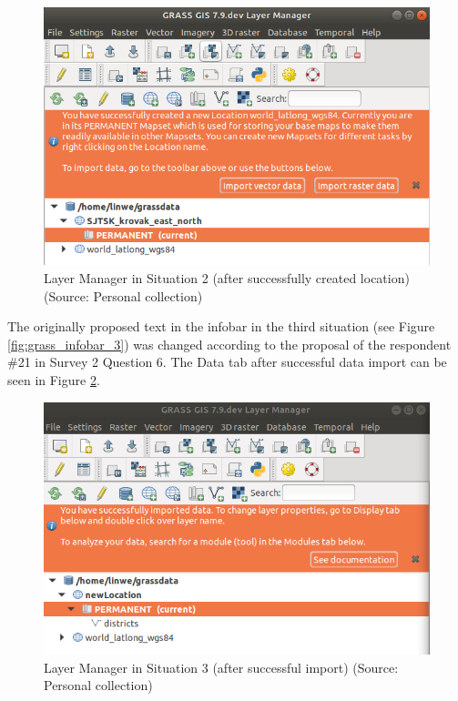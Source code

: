 \documentclass[a4paper,10pt,twoside]{article}
\begin{document}
\begin{figure}[hbt!] 
\begin{center}
\includegraphics[width=13cm]{../pictures/lmgr2.png} 
\caption[Layer Manager in Situation 2 (after successfully created
  location)]{Layer Manager in Situation 2 (after successfully created
  location) (Source: Personal collection)}
\label{fig:lmgr2}
\end{center}
\end{figure}

\noindent The originally proposed text in the infobar in the third
situation (see Figure \ref{fig:grass_infobar_3}) was changed according
to the proposal of the respondent \#21 in Survey 2 Question 6. The
Data tab after successful data import can be seen in Figure
\ref{fig:lmgr3}.

\vspace{0.3cm}
\begin{figure}[hbt!] 
\begin{center}
\includegraphics[width=13cm]{../pictures/lmgr3.png} 
\caption[Layer Manager in Situation 3 (after successful import)]{Layer
  Manager in Situation 3 (after successful import) (Source: Personal
  collection)}
\label{fig:lmgr3}
\end{center}
\end{figure}
\end{document}
